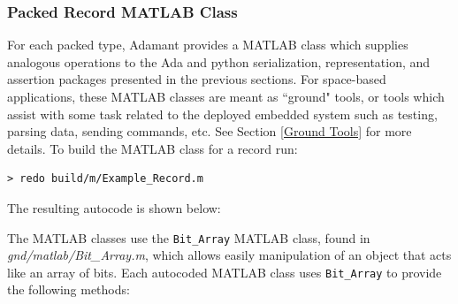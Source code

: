 \subsubsection{Packed Record MATLAB Class} \label{Packed Record MATLAB Class}

For each packed type, Adamant provides a MATLAB class which supplies analogous operations to the Ada and python serialization, representation, and assertion packages presented in the previous sections. For space-based applications, these MATLAB classes are meant as ``ground" tools, or tools which assist with some task related to the deployed embedded system such as testing, parsing data, sending commands, etc. See Section \ref{Ground Tools} for more details. To build the MATLAB class for a record run:

\vspace{5mm} %
\begin{verbatim}
> redo build/m/Example_Record.m
\end{verbatim}
\vspace{5mm} %

The resulting autocode is shown below:


The MATLAB classes use the \texttt{Bit\_Array} MATLAB class, found in \textit{gnd/matlab/Bit\_Array.m}, which allows easily manipulation of an object that acts like an array of bits. Each autocoded MATLAB class uses \texttt{Bit\_Array} to provide the following methods:

